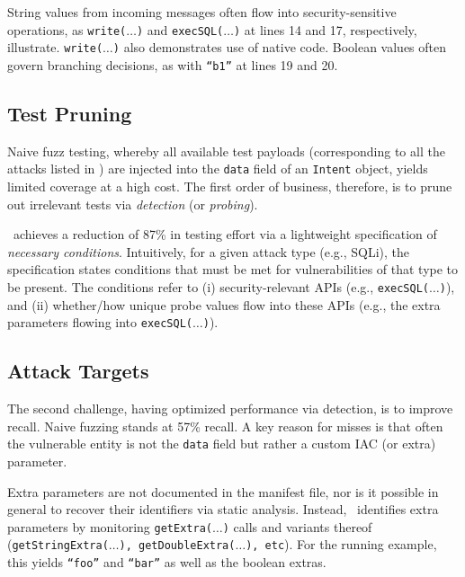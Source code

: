 String values from incoming messages often flow into security-sensitive operations, as {\tt write($\ldots$)} and {\tt execSQL($\ldots$)} at lines 14 and 17, respectively, illustrate. {\tt write($\ldots$)} also demonstrates use of native code.	Boolean values often govern branching decisions, as with {\tt ``b1''} at lines 19 and 20.

\subsection{Test Pruning}

Naive fuzz testing, whereby all available test payloads (corresponding to all the attacks listed in ) are injected into the {\tt data} field of an {\tt Intent} object, 
yields limited coverage at a high cost. The first order of business, therefore, is to prune out irrelevant tests via \emph{detection} (or \emph{probing}). 

\Tool\ achieves a reduction of 87\% in testing effort via a lightweight specification of \emph{necessary conditions}. Intuitively, for a given attack type (e.g., SQLi), the specification states conditions that must be met for vulnerabilities of that type to be present. The conditions refer to (i) security-relevant APIs (e.g., {\tt execSQL($\ldots$)}), and (ii) whether/how unique probe values flow into these APIs (e.g., the extra parameters flowing into {\tt execSQL($\ldots$)}).

\subsection{Attack Targets}

The second challenge, having optimized performance via detection, is to improve recall. Naive fuzzing stands at 57\% recall. A key reason for misses is that often the vulnerable entity is not the 
{\tt data} field but rather a custom IAC (or extra) parameter.

Extra parameters are not documented in the manifest file, nor is it possible in general to recover their identifiers via static analysis. Instead, \Tool\ identifies extra parameters by monitoring {\tt getExtra($\ldots$)} calls and variants thereof ({\tt getStringExtra($\ldots$), getDoubleExtra($\ldots$), etc}). For the running example, this yields {\tt ``foo''} and {\tt ``bar''} as well as the boolean extras.
%

